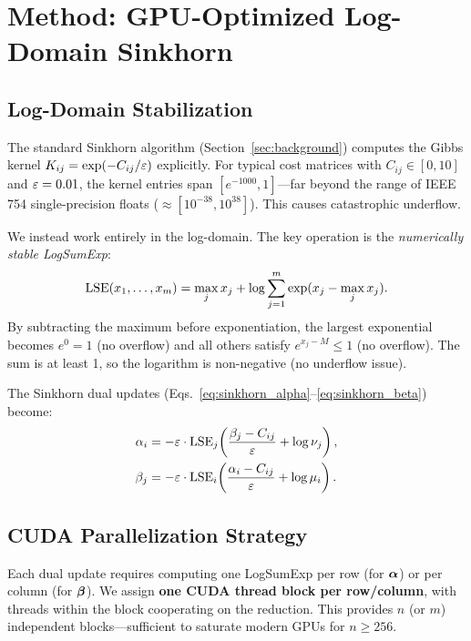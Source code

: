 
\section{Method: GPU-Optimized Log-Domain Sinkhorn}
\label{sec:method}

\subsection{Log-Domain Stabilization}
\label{sec:log_domain}

The standard Sinkhorn algorithm (Section~\ref{sec:background}) computes the Gibbs kernel $K_{ij} = \exp(-C_{ij}/\varepsilon)$ explicitly. For typical cost matrices with $C_{ij} \in [0, 10]$ and $\varepsilon = 0.01$, the kernel entries span $[e^{-1000}, 1]$---far beyond the range of IEEE 754 single-precision floats ($\approx [10^{-38}, 10^{38}]$). This causes catastrophic underflow.

We instead work entirely in the log-domain. The key operation is the \emph{numerically stable LogSumExp}:
\begin{equation}
    \label{eq:logsumexp}
    \mathrm{LSE}(x_1, \ldots, x_m) = \max_j x_j + \log \sum_{j=1}^m \exp(x_j - \max_j x_j).
\end{equation}
By subtracting the maximum before exponentiation, the largest exponential becomes $e^0 = 1$ (no overflow) and all others satisfy $e^{x_j - M} \leq 1$ (no overflow). The sum is at least 1, so the logarithm is non-negative (no underflow issue).

The Sinkhorn dual updates (Eqs.~\ref{eq:sinkhorn_alpha}--\ref{eq:sinkhorn_beta}) become:
\begin{align}
    \label{eq:log_alpha}
    \alpha_i &= -\varepsilon \cdot \mathrm{LSE}_j\!\left(\frac{\beta_j - C_{ij}}{\varepsilon} + \log \nu_j\right), \\
    \label{eq:log_beta}
    \beta_j  &= -\varepsilon \cdot \mathrm{LSE}_i\!\left(\frac{\alpha_i - C_{ij}}{\varepsilon} + \log \mu_i\right).
\end{align}

\subsection{CUDA Parallelization Strategy}
\label{sec:cuda_strategy}

Each dual update requires computing one LogSumExp per row (for $\bm{\alpha}$) or per column (for $\bm{\beta}$). We assign \textbf{one CUDA thread block per row/column}, with threads within the block cooperating on the reduction. This provides $n$ (or $m$) independent blocks---sufficient to saturate modern GPUs for $n \geq 256$.

